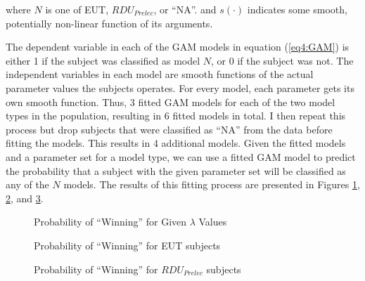 \documentclass[../main.tex]{subfiles}
\begin{document}
\noindent where $N$ is one of EUT, $\mathit{RDU_{Prelec}}$, or \enquote{NA}. and $s(\cdot)$ indicates some smooth, potentially non-linear function of its arguments.

The dependent variable in each of the GAM models in equation (\ref{eq4:GAM}) is either 1 if the subject was classified as model $N$, or 0 if the subject was not.
The independent variables in each model are smooth functions of the actual parameter values the subjects operates.
For every model, each parameter gets its own smooth function.
Thus, 3 fitted GAM models for each of the two model types in the population, resulting in 6 fitted models in total.
I then repeat this process but drop subjects that were classified as \enquote{NA} from the data before fitting the models.
This results in 4 additional models.
Given the fitted models and a parameter set for a model type, we can use a fitted GAM model to predict the probability that a subject with the given parameter set will be classified as any of the $N$ models.
The results of this fitting process are presented in Figures \ref{fig:HNG1_win_mu}, \ref{fig:HNG1_win_eut}, and \ref{fig:HNG1_win_pre}.

\begin{figure}[h!]
	\center
	\caption{Probability of \enquote{Winning} for Given $\lambda$ Values}
	\label{fig:HNG1_win_mu}
\end{figure}

\begin{figure}[h!]
	\center
	\caption{Probability of \enquote{Winning} for EUT subjects}
	\label{fig:HNG1_win_eut}
\end{figure}

\begin{figure}[h!]
	\center
	\caption{Probability of \enquote{Winning} for $\mathit{RDU_{Prelec}}$ subjects}
	\label{fig:HNG1_win_pre}
\end{figure}
\end{document}
